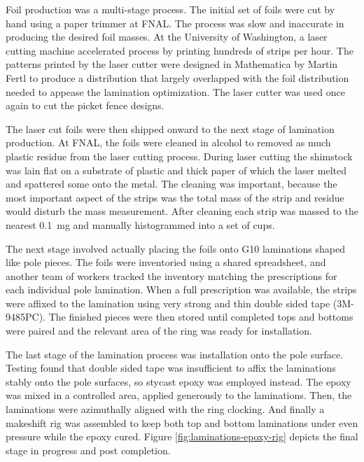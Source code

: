 
Foil production was a multi-stage process.  The initial set of foils were cut by hand using a paper trimmer at FNAL.  The process was slow and inaccurate in producing the desired foil masses.  At the University of Washington, a laser cutting machine accelerated process by printing hundreds of strips per hour.  The patterns printed by the laser cutter were designed in Mathematica by Martin Fertl to produce a distribution that largely overlapped with the foil distribution needed to appease the lamination optimization.  The laser cutter was used once again to cut the picket fence designs.  


The laser cut foils were then shipped onward to the next stage of lamination production.  At FNAL, the foils were cleaned in alcohol to removed as much plastic residue from the laser cutting process.  During laser cutting the shimstock was lain flat on a substrate of plastic and thick paper of which the laser melted and spattered some onto the metal.  The cleaning was important, because the most important aspect of the strips was the total mass of the strip and residue would disturb the mass measurement.  After cleaning each strip was massed to the nearest \SI{0.1}{\milli\gram} and manually histogrammed into a set of cups.


The next stage involved actually placing the foils onto G10 laminations shaped like pole pieces.  The foils were inventoried using a shared spreadsheet, and another team of workers tracked the inventory matching the prescriptions for each individual pole lamination.  When a full prescription was available, the strips were affixed to the lamination using very strong and thin double sided tape (3M-9485PC).  The finished pieces were then stored until completed tops and bottoms were paired and the relevant area of the ring was ready for installation.

The last stage of the lamination process was installation onto the pole surface.  Testing found that double sided tape was insufficient to affix the laminations stably onto the pole surfaces, so stycast epoxy was employed instead.  The epoxy was mixed in a controlled area, applied generously to the laminations. Then, the laminations were azimuthally aligned with the ring clocking.  And finally a makeshift rig was assembled to keep both top and bottom laminations under even pressure while the epoxy cured.  Figure \ref{fig:laminations-epoxy-rig} depicts the final stage in progress and post completion.

